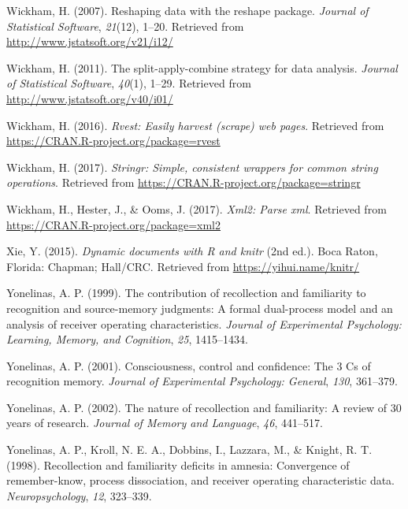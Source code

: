 \documentclass[english,,man,floatsintext]{apa6}
\begin{document}
\leavevmode\hypertarget{ref-R-reshape2}{}%
Wickham, H. (2007). Reshaping data with the reshape package. \emph{Journal of Statistical Software}, \emph{21}(12), 1--20. Retrieved from \url{http://www.jstatsoft.org/v21/i12/}

\leavevmode\hypertarget{ref-R-plyr}{}%
Wickham, H. (2011). The split-apply-combine strategy for data analysis. \emph{Journal of Statistical Software}, \emph{40}(1), 1--29. Retrieved from \url{http://www.jstatsoft.org/v40/i01/}

\leavevmode\hypertarget{ref-R-rvest}{}%
Wickham, H. (2016). \emph{Rvest: Easily harvest (scrape) web pages}. Retrieved from \url{https://CRAN.R-project.org/package=rvest}

\leavevmode\hypertarget{ref-R-stringr}{}%
Wickham, H. (2017). \emph{Stringr: Simple, consistent wrappers for common string operations}. Retrieved from \url{https://CRAN.R-project.org/package=stringr}

\leavevmode\hypertarget{ref-R-xml2}{}%
Wickham, H., Hester, J., \& Ooms, J. (2017). \emph{Xml2: Parse xml}. Retrieved from \url{https://CRAN.R-project.org/package=xml2}

\leavevmode\hypertarget{ref-R-knitr}{}%
Xie, Y. (2015). \emph{Dynamic documents with R and knitr} (2nd ed.). Boca Raton, Florida: Chapman; Hall/CRC. Retrieved from \url{https://yihui.name/knitr/}

\leavevmode\hypertarget{ref-Yonelinas:1999}{}%
Yonelinas, A. P. (1999). The contribution of recollection and familiarity to recognition and source-memory judgments: A formal dual-process model and an analysis of receiver operating characteristics. \emph{Journal of Experimental Psychology: Learning, Memory, and Cognition}, \emph{25}, 1415--1434.

\leavevmode\hypertarget{ref-Yonelinas:2001}{}%
Yonelinas, A. P. (2001). Consciousness, control and confidence: The 3 Cs of recognition memory. \emph{Journal of Experimental Psychology: General}, \emph{130}, 361--379.

\leavevmode\hypertarget{ref-Yonelinas:2002}{}%
Yonelinas, A. P. (2002). The nature of recollection and familiarity: A review of 30 years of research. \emph{Journal of Memory and Language}, \emph{46}, 441--517.

\leavevmode\hypertarget{ref-Yonelinas:etal:1998}{}%
Yonelinas, A. P., Kroll, N. E. A., Dobbins, I., Lazzara, M., \& Knight, R. T. (1998). Recollection and familiarity deficits in amnesia: Convergence of remember-know, process dissociation, and receiver operating characteristic data. \emph{Neuropsychology}, \emph{12}, 323--339.
\end{document}
